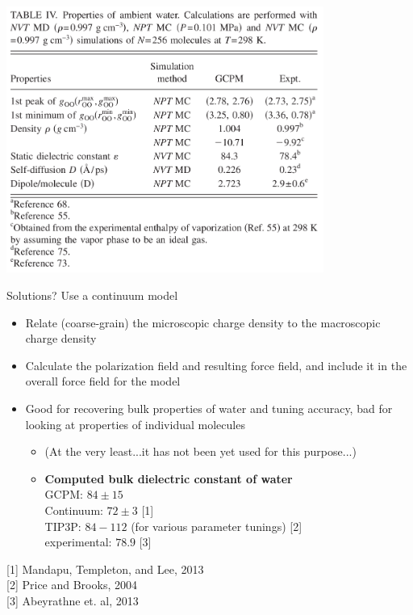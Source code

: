 \documentclass{beamer}
\begin{document}
\begin{frame}
    \begin{center}
    \includegraphics[width=0.78\textwidth]{images/gcpm_compExp.png}
    \end{center}
\end{frame}

\begin{frame}{Solutions?}
Use a continuum model
    \begin{itemize}
        \item Relate (coarse-grain) the microscopic charge density to
            the macroscopic charge density
        \item Calculate the polarization field and resulting force
            field, and include it in the overall force field for the
            model
        \item Good for recovering bulk properties of water and tuning
            accuracy, bad for looking at properties of individual
            molecules
            \begin{itemize}
                \item (At the very least...it has not been yet used for
                    this purpose...)
                \item \textbf{Computed bulk dielectric constant of water} \\
                    \scriptsize{GCPM: $84 \pm 15$ \\
                        Continuum: $72 \pm3$ [1] \\ 
                        TIP3P: $84-112$ (for various parameter tunings) [2] \\
                    experimental: $78.9$ [3]}
            \end{itemize}
    \end{itemize}
    \footnotesize{ 
        {[}1{]} Mandapu, Templeton, and Lee, 2013 \\
        {[}2{]} Price and Brooks, 2004 \\
        {[}3{]} Abeyrathne et. al, 2013 \\}
\end{frame}



\end{document}
